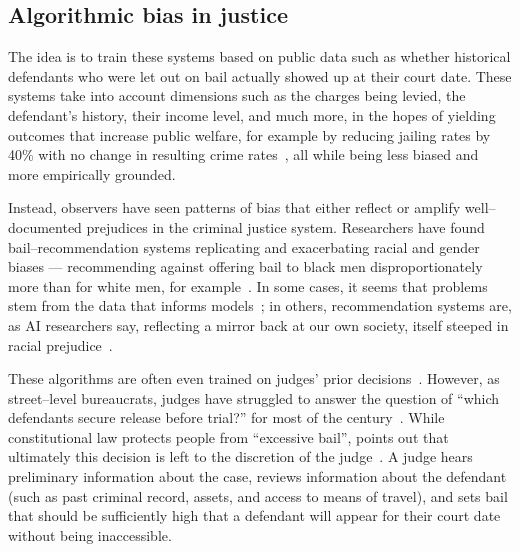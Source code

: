 \documentclass[street-level_algorithms]{subfiles}
\begin{document}
\subsection{Algorithmic bias in justice}

The idea is to train these systems based on
public data such as whether historical defendants who were let out on bail
actually showed up at their court date.
These systems take into account dimensions such as
the charges being levied,
the defendant's history,
their income level, and
much more, in the hopes of yielding outcomes that increase public welfare,
for example by reducing jailing rates by 40\% with no change in resulting crime rates~\cite{kleinberg2017human},
all while being less biased and more empirically grounded.

Instead, observers have seen patterns of bias that
either reflect or amplify
well--documented prejudices in the criminal justice system.
Researchers have found bail--recommendation systems replicating and exacerbating
racial and gender biases
--- recommending against offering bail to black men disproportionately more than for white men, for example~\cite{propublica}.
In some cases,
it seems that problems stem from the data that informs models~\cite{buolamwini2018gender};
in others, recommendation systems are,
as AI researchers say,
reflecting a mirror back at our own society,
itself steeped in racial prejudice~\cite{lambrecht2018algorithmic,thebault2015avoiding}.

These algorithms are often even trained on judges' prior decisions~\cite{kleinberg2017human}.
However, as street--level bureaucrats, judges have struggled to answer the question of
``which defendants secure release before trial?'' for most of the  century~\cite{walker1993taming}.
While constitutional law protects people from ``excessive bail'',
\citeauthor{walker1993taming} points out that ultimately
this decision is left to the discretion of the judge~\cite{walker1993taming}.
A judge hears preliminary information about the case,
reviews information about the defendant
(such as past criminal record, assets, and access to means of travel), and
sets bail that should be sufficiently high that a defendant will appear for their court date without being inaccessible.
\end{document}
